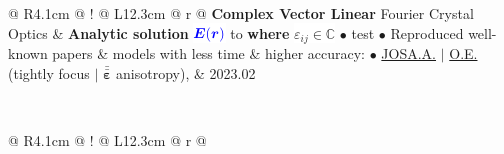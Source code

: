 {{\begin{tabularx}{\linewidth}{@{} R{4.1cm} @{\phantom{di}} !{\vrule width1.0pt} @{\phantom{di}} L{12.3cm} @{\extracolsep{\fill}} r @{}}
	\textbf{Complex Vector Linear} \newline \vspace{-3pt} {\small Fourier Crystal Optics} & \textbf{Analytic solution} \colorbox{white}{\small $ {\color{blue} \boldsymbol{E} \! \left( \boldsymbol r \right)} $} to  \textbf{where} \colorbox{white}{$\varepsilon_{ij} \in \mathbb{C}$} \newline \vspace{3pt} $\bullet$ {\small test} \newline \vspace{-3pt} $\bullet$ {\small Reproduced well-known papers \& models with less time \& higher accuracy:} \newline \vspace{-3pt} \hspace{10pt} $\bullet$ {\small \href{https://opg.optica.org/josaa/abstract.cfm?uri=josaa-27-8-1828}{JOSA.A.} $|$ \href{https://opg.optica.org/oe/fulltext.cfm?uri=oe-17-20-17970}{O.E.} {\color{color-detail} \footnotesize (tightly focus $|$ $\bar{\bar{\boldsymbol{\varepsilon}}}$ anisotropy)}, } & 2023.02 \\ \Gap\Gap
\end{tabularx}
\\
\begin{tabularx}{\linewidth}{@{} R{4.1cm} @{\phantom{di}} !{\vrule width1.0pt} @{\phantom{di}} L{12.3cm} @{\extracolsep{\fill}} r @{}}

\end{tabularx}}}
